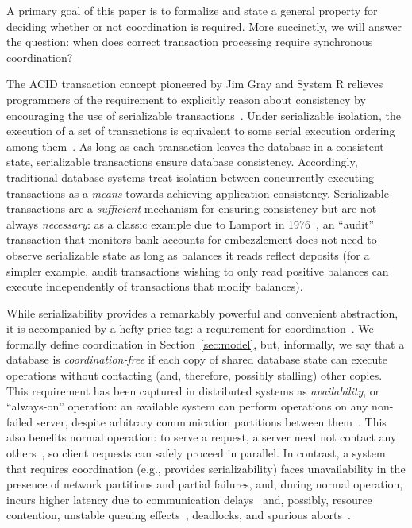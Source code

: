 A primary goal of this paper is to formalize and state
a general property for deciding whether or not coordination is
required. More succinctly, we will answer the question: when does
correct transaction processing require synchronous coordination?


 The ACID transaction concept
pioneered by Jim Gray and System R relieves programmers of the
requirement to explicitly reason about consistency by encouraging the
use of serializable transactions~\cite{gray-virtues}. Under
serializable isolation, the execution of a set of transactions is
equivalent to some serial execution ordering among
them~\cite{bernstein-book}. As long as each transaction leaves the
database in a consistent state, serializable transactions ensure
database consistency. Accordingly, traditional database systems treat
isolation between concurrently executing transactions as a
\textit{means} towards achieving application consistency. Serializable
transactions are a \textit{sufficient} mechanism for ensuring
consistency but are not always \textit{necessary}: as a classic
example due to Lamport in 1976~\cite{lamport-audit}, an ``audit''
transaction that monitors bank accounts for embezzlement does not need
to observe serializable state as long as balances it reads reflect
deposits (for a simpler example, audit transactions wishing to only
read positive balances can execute independently of transactions that
modify balances).


 While serializability provides a
remarkably powerful and convenient abstraction, it is accompanied by a
hefty price tag: a requirement for
coordination~\cite{davidson-survey}. We formally define coordination
in Section~\ref{sec:model}, but, informally, we say that a database is
\textit{coordination-free} if each copy of shared database state can
execute operations without contacting (and, therefore, possibly
stalling) other copies. This requirement has been captured in
distributed systems as \textit{availability}, or ``always-on''
operation: an available system can perform operations on any
non-failed server, despite arbitrary communication partitions between
them~\cite{gilbert-cap}. This also benefits normal operation: to serve
a request, a \cfree server need not contact any others~\cite{pacelc},
so client requests can safely proceed in parallel. In contrast, a
system that requires coordination (e.g., provides serializability)
faces unavailability in the presence of network partitions and partial
failures, and, during normal operation, incurs higher latency due to
communication delays~\cite{hat-vldb} and, possibly, resource
contention, unstable queuing effects~\cite{ladis}, deadlocks, and
spurious aborts~\cite{bernstein-book,gray-virtues}.

